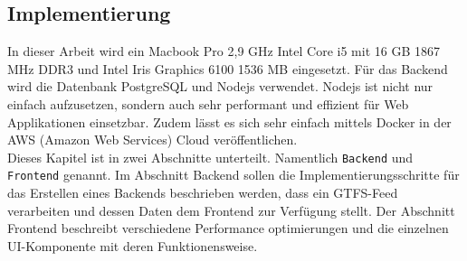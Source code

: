 \begin{newpage}
\section{Implementierung}
\label{sec:implementierung}
  In dieser Arbeit wird ein Macbook Pro 2,9 GHz Intel Core i5 mit 16 GB 1867 MHz DDR3 und Intel Iris Graphics 6100 1536 MB eingesetzt.
  Für das Backend wird die Datenbank PostgreSQL und Nodejs verwendet. Nodejs ist nicht nur einfach aufzusetzen, sondern auch sehr performant und effizient für Web Applikationen einsetzbar. Zudem lässt es sich sehr einfach mittels Docker in der AWS (Amazon Web Services) Cloud veröffentlichen.\\

  Dieses Kapitel ist in zwei Abschnitte unterteilt. Namentlich \texttt{Backend} und \texttt{Frontend} genannt. Im Abschnitt Backend sollen die Implementierungsschritte für das Erstellen eines Backends beschrieben werden, dass ein GTFS-Feed verarbeiten und dessen Daten dem Frontend zur Verfügung stellt. Der Abschnitt Frontend beschreibt verschiedene Performance optimierungen und die einzelnen UI-Komponente mit deren Funktionensweise.

  

  

\end{newpage}